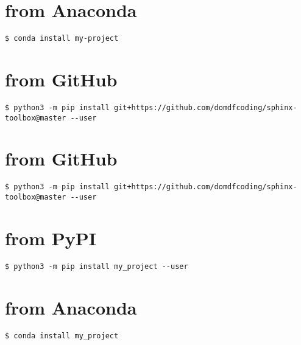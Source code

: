 \documentclass[letterpaper,10pt,english]{sphinxmanual}
\begin{document}
\chapter{from Anaconda}
\label{\detokenize{installation:installation-5-from_Anaconda}}\label{\detokenize{installation:installation-5}}
\begin{Verbatim}[commandchars=\\\{\}]
$ conda install my-project
\end{Verbatim}


\chapter{from GitHub}
\label{\detokenize{installation:installation-6-from_GitHub}}\label{\detokenize{installation:installation-6}}
\begin{Verbatim}[commandchars=\\\{\}]
$ python3 -m pip install git+https://github.com/domdfcoding/sphinx-toolbox@master --user
\end{Verbatim}


\chapter{from GitHub}
\label{\detokenize{installation:installation-7-from_GitHub}}\label{\detokenize{installation:installation-7}}
\begin{Verbatim}[commandchars=\\\{\}]
$ python3 -m pip install git+https://github.com/domdfcoding/sphinx-toolbox@master --user
\end{Verbatim}


\chapter{from PyPI}
\label{\detokenize{installation:installation-8-from_PyPI}}\label{\detokenize{installation:installation-8}}
\begin{Verbatim}[commandchars=\\\{\}]
$ python3 -m pip install my_project --user
\end{Verbatim}


\chapter{from Anaconda}
\label{\detokenize{installation:installation-8-from_Anaconda}}
\begin{Verbatim}[commandchars=\\\{\}]
$ conda install my_project
\end{Verbatim}
\end{document}
